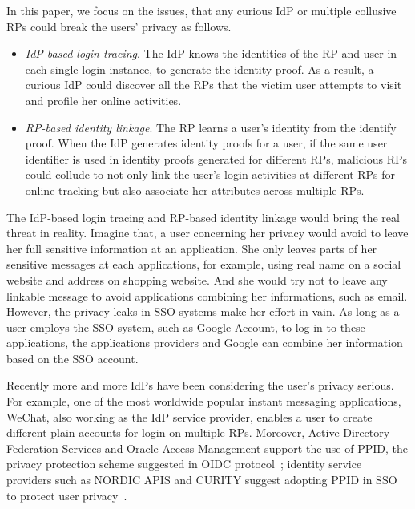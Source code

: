 In this paper, we focus on the issues, that any curious IdP or multiple collusive RPs could break the users' privacy as follows.
\begin{itemize}
\item {\em IdP-based login tracing}. The IdP knows the identities of the RP and user in each single login instance, to generate the identity proof.
As a result, a curious IdP could discover all the RPs that the victim user attempts to visit and profile her online activities.
\item {\em RP-based identity linkage}. The RP learns a user's identity from the identify proof.
When the IdP generates identity proofs for a user, if the same user identifier is used in identity proofs generated for different RPs, malicious RPs could collude to not only link the user's login activities at different RPs for online tracking but also associate her attributes across multiple RPs.
\end{itemize}

The IdP-based login tracing and RP-based identity linkage would bring the real threat in reality. Imagine that, a user concerning her privacy would avoid to leave her full sensitive information at an application. She only leaves parts of her sensitive messages at each applications, for example, using real name on a social website and address on shopping website. And she would try not to leave any linkable message to avoid applications combining her informations, such as email.
However, the privacy leaks in SSO systems make her effort in vain. As long as a user employs the SSO system, such as Google Account, to log in to these applications, the applications providers and Google can combine her information based on the SSO account.

Recently more and more IdPs have been considering the user's privacy serious. For example, one of the most worldwide popular instant messaging applications, WeChat, also working as the IdP service provider, enables a user to create different plain accounts for login on multiple RPs. Moreover, Active Directory Federation Services and Oracle Access Management support the use of PPID, the privacy protection scheme suggested in OIDC protocol~\cite{MS, Oracle}; identity service providers such as NORDIC APIS and CURITY suggest adopting PPID in SSO to protect user privacy~\cite{Nordic, Curity}.

